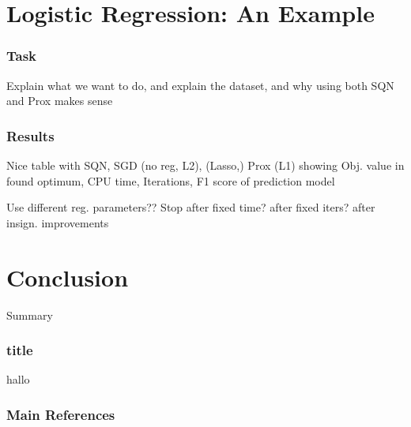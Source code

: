 \documentclass[10pt]{beamer}
\begin{document}
\section{Logistic Regression: An Example}
  \begin{frame}\frametitle{Task}
    Explain what we want to do, and explain the dataset,
    and why using both SQN and Prox makes sense   
  \end{frame}

  \begin{frame}\frametitle{Results}
    Nice table with SQN, SGD (no reg, L2), (Lasso,) Prox (L1) showing
    Obj. value in found optimum, CPU time, Iterations, F1 score of prediction model

    Use different reg. parameters??
    Stop after fixed time? after fixed iters? after insign. improvements  
  \end{frame}

\section{Conclusion}

  \begin{frame}{Summary}
    \begin{center}\ccbysa\end{center}
  \end{frame}

  \begin{frame}
    \frametitle{title}
    \begin{figure}
      \newlength\figureheight
      \newlength\figurewidth
      \setlength\figureheight{4cm}
      \setlength\figurewidth{6cm}
          
    \end{figure}


      hallo
  \end{frame}


  \begin{frame}[allowframebreaks]\frametitle{Main References}

    
    

  \end{frame}
\end{document}
